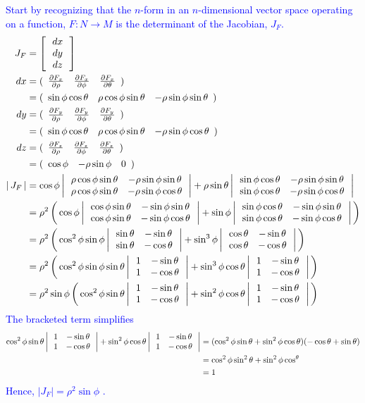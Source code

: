 \documentclass[12pt,a4paper]{report}
\newcommand{\BLUE}[1]{\textcolor{blue}{#1}}
\begin{document}
\begin{enumerate}[label=19.\arabic*]
\BLUE{Start by recognizing that the $n$-form in an $n$-dimensional vector space operating on a function, $F: N \to M$ is the determinant of the Jacobian, $J_F$.
\begin{align*}
	J_F &= \left [\, \begin{array}{c}  dx \\ dy \\ dz  \end{array}  \,\right ] \\
	dx &= (\begin{array}{cccccccccc} \frac{\partial F_x}{\partial \rho} &  \frac{\partial F_x}{\partial \phi} & \frac{\partial F_x}{\partial \theta} \end{array}) \\
		&= (\begin{array}{cccccccccc} \sin\phi\cos\theta & \rho\cos\phi\sin\theta & -\rho\sin\phi\sin\theta \end{array}) \\
	dy &= (\begin{array}{cccccccccc} \frac{\partial F_y}{\partial \rho} &  \frac{\partial F_y}{\partial \phi} & \frac{\partial F_y}{\partial \theta} \end{array}) \\
	&= (\begin{array}{cccccccccc} \sin\phi\cos\theta & \rho\cos\phi\sin\theta & -\rho\sin \phi\cos\theta  \end{array})\\
	dz &= (\begin{array}{cccccccccc} \frac{\partial F_z}{\partial \rho} &  \frac{\partial F_z}{\partial \phi} & \frac{\partial F_z}{\partial \theta} \end{array}) \\
	&= (\begin{array}{cccccccccc} \cos \phi & -\rho\sin\phi & 0 \end{array}) \\
	\left |\, J_F \,\right | &= \cos\phi\left |\,  \begin{array}{c c} \rho\cos\phi\sin\theta& -\rho\sin\phi\sin\theta \\  \rho\cos\phi\sin\theta &  -\rho\sin \phi\cos\theta  \end{array}  \,\right |+\rho\sin\theta\left |\,  \begin{array}{c c} \sin\phi\cos\theta & -\rho\sin\phi\sin\theta \\ \sin\phi\cos\theta  &  -\rho\sin \phi\cos\theta \end{array}  \,\right |\\
	&= \rho^2\left (\,  \cos\phi\left |\,  \begin{array}{c c} \cos\phi\sin\theta& -\sin\phi\sin\theta \\  \cos\phi\sin\theta &  -\sin \phi\cos\theta  \end{array}  \,\right |+\sin\phi\left |\,  \begin{array}{c c} \sin\phi\cos\theta & -\sin\phi\sin\theta \\ \sin\phi\cos\theta  &  -\sin \phi\cos\theta \end{array}  \,\right | \,\right )\\
	&= \rho^2\left (\,  \cos^2\phi\sin\phi \left |\,  \begin{array}{c c} \sin\theta& -\sin\theta \\  \sin\theta &  -\cos\theta  \end{array}  \,\right |+\sin^3\phi\left |\,  \begin{array}{c c} \cos\theta & -\sin\theta \\ \cos\theta  &  -\cos\theta \end{array}  \,\right | \,\right )\\
	&= \rho^2\left (\,  \cos^2\phi\sin\phi \sin\theta\left |\,  \begin{array}{c c} 1& -\sin\theta \\  1 &  -\cos\theta  \end{array}  \,\right |+\sin^3\phi\cos\theta \left |\,  \begin{array}{c c} 1 & -\sin\theta \\ 1  &  -\cos\theta \end{array}  \,\right | \,\right )\\
	&= \rho^2\sin\phi\left (\,  \cos^2\phi \sin\theta\left |\,  \begin{array}{c c} 1& -\sin\theta \\  1 &  -\cos\theta  \end{array}  \,\right |+\sin^2\phi\cos\theta \left |\,  \begin{array}{c c} 1 & -\sin\theta \\ 1  &  -\cos\theta \end{array}  \,\right | \,\right )
\end{align*}The bracketed term simplifies
\begin{align*}
	\cos^2\phi \sin\theta\left |\,  \begin{array}{c c} 1& -\sin\theta \\  1 &  -\cos\theta  \end{array}  \,\right |+\sin^2\phi\cos\theta \left |\,  \begin{array}{c c} 1 & -\sin\theta \\ 1  &  -\cos\theta \end{array}  \,\right | &= (\cos^2\phi \sin\theta+\sin^2\phi\cos\theta )( -\cos\theta  +\sin\theta) \\
	&=\cos^2\phi \sin^2\theta +\sin^2\phi\cos^\theta \\
	&= 1
\end{align*}Hence, $|J_F| = \rho^2\sin\phi$ .
}


\end{enumerate}
\end{document}
